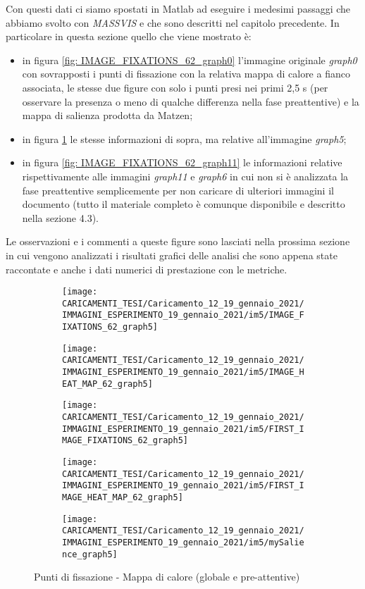 \documentclass[%
	corpo=12pt,
    twoside,
    stile=classica,
    oldstyle,
    tipotesi=custom,
    greek,
    evenboxes,
]{toptesi}
\begin{document}
{Con questi dati ci siamo spostati in Matlab ad eseguire i medesimi passaggi che abbiamo svolto con \textit{MASSVIS} e che sono descritti nel capitolo precedente. In particolare in questa sezione quello che viene mostrato è: 

\begin{itemize}
\item in figura \ref{fig: IMAGE_FIXATIONS_62_graph0} l'immagine originale \textit{graph0} con sovrapposti i punti di fissazione  con la relativa mappa di calore a fianco associata, le stesse due figure con solo i punti presi nei primi 2,5 s (per osservare la presenza o meno di qualche differenza nella fase preattentive) e la mappa di salienza prodotta da Matzen;
\item in figura \ref{fig: IMAGE_FIXATIONS_62_graph5} le stesse informazioni di sopra, ma relative all'immagine \textit{graph5};
\item in figura \ref{fig: IMAGE_FIXATIONS_62_graph11} le informazioni relative rispettivamente alle immagini \textit{graph11} e \textit{graph6} in cui non si è analizzata la fase preattentive semplicemente per non caricare di ulteriori immagini il documento (tutto il materiale completo è comunque disponibile e descritto nella sezione 4.3).
\end{itemize}

Le osservazioni e i commenti a queste figure sono lasciati nella prossima sezione in cui vengono analizzati i risultati grafici delle analisi che sono appena state raccontate e anche i dati numerici di prestazione con le metriche.


\begin{figure}[!htb]\centering
\begin{subfigure}
\centering
\texttt{[image: CARICAMENTI\_TESI/Caricamento\_12\_19\_gennaio\_2021/IMMAGINI\_ESPERIMENTO\_19\_gennaio\_2021/im5/IMAGE\_FIXATIONS\_62\_graph5]}
\end{subfigure}
\begin{subfigure}
\centering
\texttt{[image: CARICAMENTI\_TESI/Caricamento\_12\_19\_gennaio\_2021/IMMAGINI\_ESPERIMENTO\_19\_gennaio\_2021/im5/IMAGE\_HEAT\_MAP\_62\_graph5]}
\end{subfigure}
\begin{subfigure}
\centering
\texttt{[image: CARICAMENTI\_TESI/Caricamento\_12\_19\_gennaio\_2021/IMMAGINI\_ESPERIMENTO\_19\_gennaio\_2021/im5/FIRST\_IMAGE\_FIXATIONS\_62\_graph5]}
\end{subfigure}
\begin{subfigure}
\centering
\texttt{[image: CARICAMENTI\_TESI/Caricamento\_12\_19\_gennaio\_2021/IMMAGINI\_ESPERIMENTO\_19\_gennaio\_2021/im5/FIRST\_IMAGE\_HEAT\_MAP\_62\_graph5]}
\end{subfigure}
\begin{subfigure}
\centering
\texttt{[image: CARICAMENTI\_TESI/Caricamento\_12\_19\_gennaio\_2021/IMMAGINI\_ESPERIMENTO\_19\_gennaio\_2021/im5/mySalience\_graph5]}
\end{subfigure}
\caption{Punti di fissazione - Mappa di calore (globale e pre-attentive)}\label{fig: IMAGE_FIXATIONS_62_graph5}
\end{figure}

}
\end{document}
